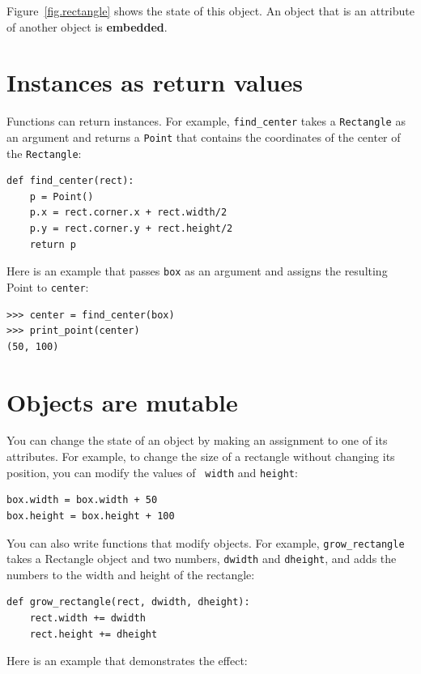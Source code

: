 \documentclass[10pt]{book}
\begin{document}
Figure~\ref{fig.rectangle} shows the state of this object.
An object that is an attribute of another object is {\bf embedded}.


\section{Instances as return values}

Functions can return instances.  For example, \verb"find_center"
takes a {\tt Rectangle} as an argument and returns a {\tt Point}
that contains the coordinates of the center of the {\tt Rectangle}:

\begin{verbatim}
def find_center(rect):
    p = Point()
    p.x = rect.corner.x + rect.width/2
    p.y = rect.corner.y + rect.height/2
    return p
\end{verbatim}
%
Here is an example that passes {\tt box} as an argument and assigns
the resulting Point to {\tt center}:

\begin{verbatim}
>>> center = find_center(box)
>>> print_point(center)
(50, 100)
\end{verbatim}
%

\section{Objects are mutable}

You can change the state of an object by making an assignment to one of
its attributes.  For example, to change the size of a rectangle
without changing its position, you can modify the values of {\tt
width} and {\tt height}:

\begin{verbatim}
box.width = box.width + 50
box.height = box.height + 100
\end{verbatim}
%
You can also write functions that modify objects.  For example,
\verb"grow_rectangle" takes a Rectangle object and two numbers,
{\tt dwidth} and {\tt dheight}, and adds the numbers to the
width and height of the rectangle:

\begin{verbatim}
def grow_rectangle(rect, dwidth, dheight):
    rect.width += dwidth
    rect.height += dheight
\end{verbatim}
%
Here is an example that demonstrates the effect:
\end{document}
